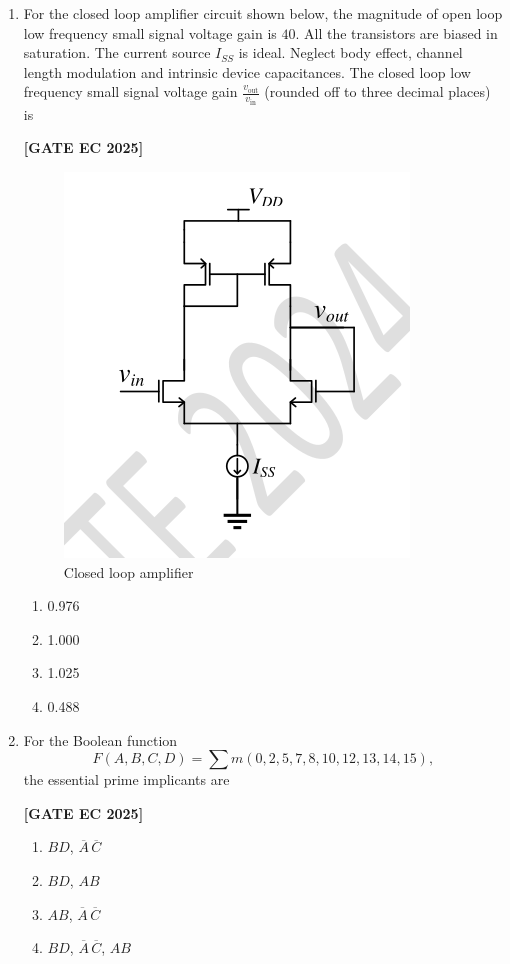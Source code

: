 \documentclass[12pt]{article}
\begin{document}
\begin{enumerate}[leftmargin=1.5em, label=\textbf{Q.\arabic*}., itemsep=2em]
\item For the closed loop amplifier circuit shown below, the magnitude of open loop low frequency small signal voltage gain is $40$. All the transistors are biased in saturation. The current source $I_{SS}$ is ideal. Neglect body effect, channel length modulation and intrinsic device capacitances. The closed loop low frequency small signal voltage gain $\tfrac{v_{\text{out}}}{v_{\text{in}}}$ (rounded off to three decimal places) is

\noindent \textbf{[GATE EC 2025]}
\begin{figure}[H]\centering
\includegraphics[width=0.65\columnwidth]{figs/q18.png}
\caption{Closed loop amplifier}
\label{fig:q18}
\end{figure}
\begin{multicols}{2}
\begin{enumerate}
    \item 0.976
    \item 1.000
    \item 1.025
    \item 0.488
\end{enumerate}
\end{multicols}

\item For the Boolean function
\[
F(A,B,C,D) = \sum m(0,2,5,7,8,10,12,13,14,15),
\]
the essential prime implicants are

\noindent \textbf{[GATE EC 2025]}
\begin{multicols}{2}
\begin{enumerate}
    \item $BD$, $\overline{A}\,\overline{C}$
    \item $BD$, $AB$
    \item $AB$, $\overline{A}\,\overline{C}$
    \item $BD$, $\overline{A}\,\overline{C}$, $AB$
\end{enumerate}
\end{multicols}


\end{enumerate}
\end{document}
